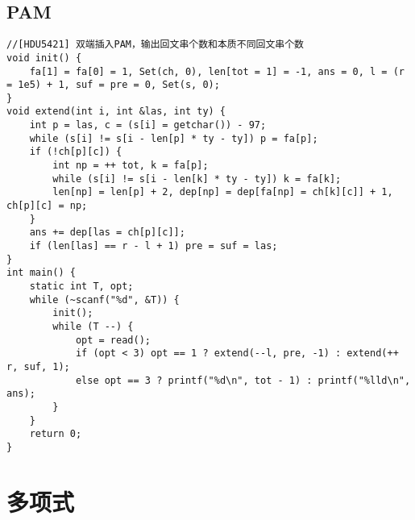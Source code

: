 \documentclass[twocolumn,a4]{article}
\begin{document}
\subsection{PAM}
\begin{lstlisting}
//[HDU5421] 双端插入PAM，输出回文串个数和本质不同回文串个数
void init() {
    fa[1] = fa[0] = 1, Set(ch, 0), len[tot = 1] = -1, ans = 0, l = (r = 1e5) + 1, suf = pre = 0, Set(s, 0);
}
void extend(int i, int &las, int ty) {
    int p = las, c = (s[i] = getchar()) - 97;
    while (s[i] != s[i - len[p] * ty - ty]) p = fa[p];
    if (!ch[p][c]) {
        int np = ++ tot, k = fa[p];
        while (s[i] != s[i - len[k] * ty - ty]) k = fa[k];
        len[np] = len[p] + 2, dep[np] = dep[fa[np] = ch[k][c]] + 1, ch[p][c] = np;
    }
    ans += dep[las = ch[p][c]];
    if (len[las] == r - l + 1) pre = suf = las;
}
int main() {
    static int T, opt;
    while (~scanf("%d", &T)) {
        init();
        while (T --) {
            opt = read();
            if (opt < 3) opt == 1 ? extend(--l, pre, -1) : extend(++ r, suf, 1);
            else opt == 3 ? printf("%d\n", tot - 1) : printf("%lld\n", ans);
        }
    }
    return 0;
}
\end{lstlisting}

\section{多项式}
\end{document}
